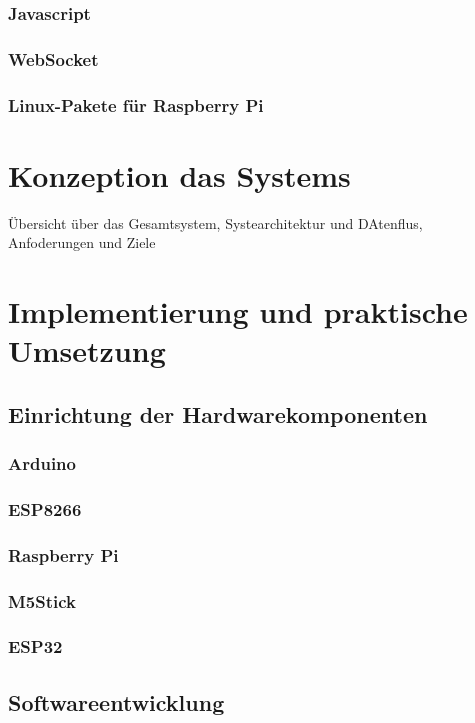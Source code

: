 \documentclass[12pt, letterpaper]{article}
\begin{document}
    \subsubsection{Javascript}
    \subsubsection{WebSocket}
    \subsubsection{Linux-Pakete für Raspberry Pi}

\newpage
\section{Konzeption das Systems}
\par Übersicht über das Gesamtsystem, Systearchitektur und DAtenflus, Anfoderungen und Ziele

\newpage
\section{Implementierung und praktische Umsetzung}
\subsection{Einrichtung der Hardwarekomponenten}
  \subsubsection{Arduino}
  \subsubsection{ESP8266}
  \subsubsection{Raspberry Pi}
  \subsubsection{M5Stick}
  \subsubsection{ESP32}

\subsection{Softwareentwicklung}
\end{document}
